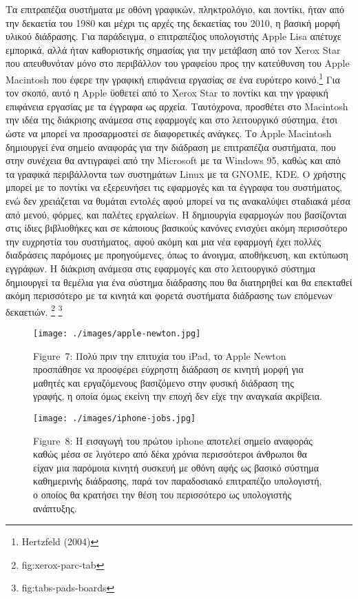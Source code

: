 \documentclass[
]{article}
\begin{document}
Τα επιτραπέζια συστήματα με οθόνη γραφικών, πληκτρολόγιο, και ποντίκι,
ήταν από την δεκαετία του 1980 και μέχρι τις αρχές της δεκαετίας του
2010, η βασική μορφή υλικού διάδρασης. Για παράδειγμα, ο επιτραπέζιος
υπολογιστής Apple Lisa απέτυχε εμπορικά, αλλά ήταν καθοριστικής σημασίας
για την μετάβαση από τον Xerox Star που απευθυνόταν μόνο στο περιβάλλον
του γραφείου προς την κατεύθυνση του Apple Macintosh που έφερε την
γραφική επιφάνεια εργασίας σε ένα ευρύτερο κοινό.\footnote{Hertzfeld
  (2004)} Για τον σκοπό, αυτό η Apple ϋοθετεί από το Xerox Star το
ποντίκι και την γραφική επιφάνεια εργασίας με τα έγγραφα ως αρχεία.
Ταυτόχρονα, προσθέτει στο Macintosh την ιδέα της διάκρισης ανάμεσα στις
εφαρμογές και στο λειτουργικό σύστημα, έτσι ώστε να μπορεί να
προσαρμοστεί σε διαφορετικές ανάγκες. Το Apple Macintosh δημιουργεί ένα
σημείο αναφοράς για την διάδραση με επιτραπέζια συστήματα, που στην
συνέχεια θα αντιγραφεί από την Microsoft με τα Windows 95, καθώς και από
τα γραφικά περιβάλλοντα των συστημάτων Linux με τα GNOME, KDE. Ο χρήστης
μπορεί με το ποντίκι να εξερευνήσει τις εφαρμογές και τα έγγραφα του
συστήματος, ενώ δεν χρειάζεται να θυμάται εντολές αφού μπορεί να τις
ανακαλύψει σταδιακά μέσα από μενού, φόρμες, και παλέτες εργαλείων. Η
δημιουργία εφαρμογών που βασίζονται στις ίδιες βιβλιοθήκες και σε
κάποιους βασικούς κανόνες ενισχύει ακόμη περισσότερο την ευχρηστία του
συστήματος, αφού ακόμη και μια νέα εφαρμογή έχει πολλές διαδράσεις
παρόμοιες με προηγούμενες, όπως το άνοιγμα, αποθήκευση, και εκτύπωση
εγγράφων. Η διάκριση ανάμεσα στις εφαρμογές και στο λειτουργικό σύστημα
δημιουργεί τα θεμέλια για ένα σύστημα διάδρασης που θα διατηρηθεί και θα
επεκταθεί ακόμη περισσότερο με τα κινητά και φορετά συστήματα διάδρασης
των επόμενων δεκαετιών. \footnote{fig:xerox-parc-tab} \footnote{fig:tabs-pads-boards}

\leavevmode{}%
\begin{figure}
\hypertarget{fig:apple-newton}{%
\centering
\texttt{[image: ./images/apple-newton.jpg]}
\caption{Figure~7: Πολύ πριν την επιτυχία του iPad, το Apple Newton
προσπάθησε να προσφέρει εύχρηστη διάδραση σε κινητή μορφή για μαθητές
και εργαζόμενους βασιζόμενο στην φυσική διάδραση της γραφής, η οποία
όμως εκείνη την εποχή δεν είχε την αναγκαία
ακρίβεια.}\label{fig:apple-newton}
}
\end{figure}

\leavevmode{}%
\begin{figure}
\hypertarget{fig:iphone-jobs}{%
\centering
\texttt{[image: ./images/iphone-jobs.jpg]}
\caption{Figure~8: Η εισαγωγή του πρώτου iphone αποτελεί σημείο αναφοράς
καθώς μέσα σε λιγότερο από δέκα χρόνια περισσότεροι άνθρωποι θα είχαν
μια παρόμοια κινητή συσκευή με οθόνη αφής ως βασικό σύστημα καθημερινής
διάδρασης, παρά τον παραδοσιακό επιτραπέζιο υπολογιστή, ο οποίος θα
κρατήσει την θέση του περισσότερο ως υπολογιστής
ανάπτυξης.}\label{fig:iphone-jobs}
}
\end{figure}
\end{document}
